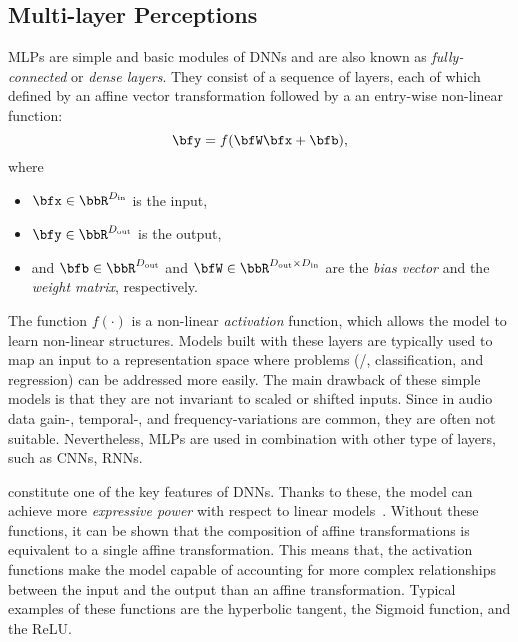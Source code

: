 \subsection{Multi-layer Perceptions}\label{subsec:lantern:mlp}
\acfp{MLP} are simple and basic modules of \acp{DNN} and are also known as \textit{fully-connected} or \textit{dense layers}.
They consist of a sequence of layers, each of which defined by an affine vector transformation followed by a an entry-wise non-linear function:
\begin{equation*}
    \bfy = f(\bfW \bfx + \bfb)
    ,
\end{equation*}
where
\newcommand{\Din}{\ensuremath{D_{\text{in}}}}
\newcommand{\Dout}{\ensuremath{D_{\text{out}}}}
\begin{itemize}
    \item $\bfx\in\bbR^{\Din}$ is the input,
    \item $\bfy\in\bbR^{\Dout}$ is the output,
    \item and $\bfb\in\bbR^{\Dout}$ and $\bfW\in\bbR^{\Dout \times \Din}$ are the \textit{bias vector} and the \textit{weight matrix}, respectively.
\end{itemize}
The function $f(\cdot)$ is a non-linear \textit{activation} function, which allows the model to learn non-linear structures.
Models built with these layers are typically used to map an input to a representation space where problems (\eg/, classification, and regression) can be addressed more easily.
The main drawback of these simple models is that they are not invariant to scaled or shifted inputs.
Since in audio data gain-, temporal-, and frequency-variations are common, they are often not suitable.
Nevertheless, \acp{MLP} are used in combination with other type of layers, such as \acfp{CNN}, \acfp{RNN}.

 constitute one of the key features of \acp{DNN}.
Thanks to these, the model can achieve more \textit{expressive power} with respect to linear models~.
Without these functions, it can be shown that the composition of affine transformations is equivalent to a single affine transformation.
This means that, the activation functions make the model capable of accounting for more complex relationships between the input and the output than an affine transformation.
Typical examples of these functions are the hyperbolic tangent, the Sigmoid function, and the \acf{ReLU}.


